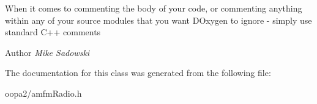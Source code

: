 When it comes to commenting the body of your code, or commenting anything within any of your source modules that you want D\-Oxygen to ignore -\/ simply use standard C++ comments

\begin{DoxyAuthor}{Author}
{\itshape Mike Sadowski} 
\end{DoxyAuthor}


The documentation for this class was generated from the following file\-:\begin{DoxyCompactItemize}
\item 
oopa2/amfm\-Radio.\-h\end{DoxyCompactItemize}
